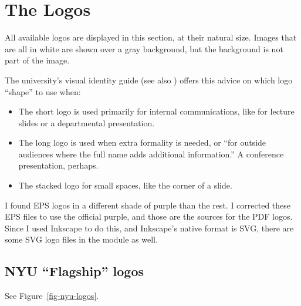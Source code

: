 \documentclass{ltxdoc}
\begin{document}
\section{The Logos}

All available logos are displayed in this section, at their natural size.  Images 
that are all in white are shown over a gray background, but the background is not 
part of the image.

The university's visual identity guide \cite{nyu-downloads} (see also
\cite{nyu-logo-basics}) offers this advice on which logo “shape” to use when:

\begin{itemize}
    \item The short logo is used primarily for internal communications, like for 
    lecture slides or a departmental presentation.
    \item The long logo is used when extra formality is needed, or “for outside
    audiences where the full name adds additional information.”  A conference presentation,
    perhaps.
    \item The stacked logo for small spaces, like the corner of a slide.
\end{itemize}

I found EPS logos in a different shade of purple than the rest.  I corrected these
EPS files to use the official purple, and those are the sources for the PDF logos. 
Since I used Inkscape to do this, and Inkscape's native format is SVG, there are 
some SVG logo files in the module as well.  

\subsection{NYU “Flagship” logos}

See Figure~\ref{fig-nyu-logos}.
\end{document}
